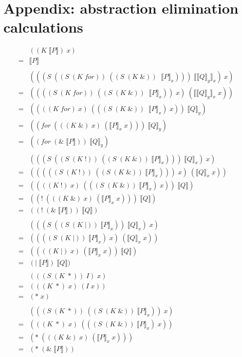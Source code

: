 \documentclass[a4paper,UKenglish]{lipics-v2016}
\newcommand{\interp}[1]{\llbracket #1 \rrbracket}
\begin{document}
\section{Appendix: abstraction elimination calculations}
\[\begin{array}{rl}
  & ((K\; \interp{P})\; x) \\
  = & \interp{P}\\
  \\
  
  & (((S\; ((S\; (K\; for))\; ((S\; (K\; \&))\; \; \interp{P}_x)))\; \interp{\interp{Q}_y}_x)\; x)\\
  =&  ((((S\; (K\; for))\; ((S\; (K\; \&))\; \; \interp{P}_x))\; x)\; (\interp{\interp{Q}_y}_x\; x))\\
  =&  ((((K\; for)\; x)\; (((S\; (K\; \&))\; \; \interp{P}_x)\; x))\; \interp{Q}_y)\\
  =&  ((for\; (((K\; \&)\; x)\; (\interp{P}_x\; x)))\; \interp{Q}_y)\\
  =&  ((for\; (\&\; \interp{P}))\; \interp{Q}_y)\\
  \\
  & (((S\; ((S\; (K\; !))\; ((S\; (K\; \&))\; \interp{P}_x)))\; \interp{Q}_x)\; x)\\
  =&  (((((S\; (K\; !))\; ((S\; (K\; \&))\; \interp{P}_x)))\; x)\; (\interp{Q}_x\; x))\\
  =&  ((((K\; !)\; x)\; (((S\; (K\; \&))\; \interp{P}_x)\; x))\; \interp{Q})\\
  =&  ((!\; (((K\; \&)\; x)\; (\interp{P}_x\; x)))\; \interp{Q})\\
  =&  ((!\; (\&\; \interp{P}))\; \interp{Q})\\
  \\
  & (((S\; ((S\; (K\; |))\; \interp{P}_x))\; \interp{Q}_x)\; x)\\
  =& ((((S\; (K\; |))\; \interp{P}_x)\; x)\; (\interp{Q}_x\; x))\\
  =& ((((K\; |)\; x)\; (\interp{P}_x\; x))\; \interp{Q})\\
  =& (|\; \interp{P})\; \interp{Q})\\
  \\
  & (((S\; (K\; *))\; I)\; x)\\
  =&  (((K\; *)\; x)\; (I\; x))\\
  =&  (*\; x)\\
  \\
  & (((S\; (K\; *))\; ((S\; (K\; \&))\; \interp{P}_x))\; x)\\
  =&  (((K\; *)\; x)\; (((S\; (K\; \&))\; \interp{P}_x)\; x))\\
  =&  (*\; (((K\; \&)\; x)\; (\interp{P}_x\; x)))\\
  =&  (*\; (\&\; \interp{P}))\\
\end{array}\]



\end{document}
